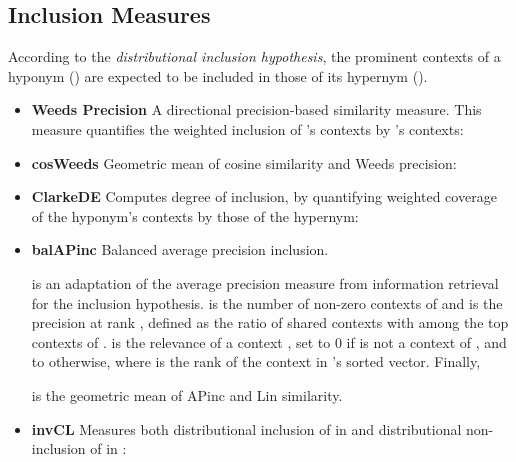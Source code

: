 \documentclass[11pt]{article}
\begin{document}
\subsection{Inclusion Measures}
\label{sec:inclusion_measures}

According to the \emph{distributional inclusion hypothesis}, the prominent contexts of a hyponym () are expected to be included in those of its hypernym (). 

\begin{itemize}[leftmargin=*]

	\item \textbf{Weeds Precision} \cite{weeds2003general} A directional precision-based similarity measure. This measure quantifies the weighted inclusion of 's contexts by 's contexts: 
	
	
	\item \textbf{cosWeeds} \cite{lenci2012identifying} Geometric mean of cosine similarity and Weeds precision:
	\small
	
	\normalsize
	
	\item \textbf{ClarkeDE} \cite{clarke2009context} Computes degree of inclusion, by quantifying weighted coverage of the hyponym's contexts by those of the hypernym:
	\small
	
	\normalsize

	\item \textbf{balAPinc} \cite{kotlerman2010directional} Balanced average precision inclusion.
	\small
	
	\normalsize
	\noindent is an adaptation of the average precision measure from information retrieval for the inclusion hypothesis.  is the number of non-zero contexts of  and  is the precision at rank , defined as the ratio of shared contexts with  among the top  contexts of .  is the relevance of a context , set to 0 if  is not a context of , and to  otherwise, where  is the rank of the context  in 's sorted vector. Finally, 
	\small
	
	\normalsize
	\noindent is the geometric mean of APinc and Lin similarity.

	\item \textbf{invCL} \cite{lenci2012identifying} Measures both distributional inclusion of  in  and distributional
non-inclusion of  in : 

	\small
	
	\normalsize
	
	\end{itemize}
	
\end{document}
